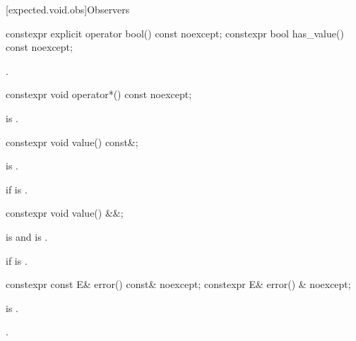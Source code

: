 [expected.void.obs]{Observers}

%
%
\begin{itemdecl}
constexpr explicit operator bool() const noexcept;
constexpr bool has_value() const noexcept;
\end{itemdecl}

\begin{itemdescr}
\pnum
\returns
{}.
\end{itemdescr}

%
\begin{itemdecl}
constexpr void operator*() const noexcept;
\end{itemdecl}

\begin{itemdescr}
\pnum
\hardexpects
{} is .
\end{itemdescr}

%
\begin{itemdecl}
constexpr void value() const&;
\end{itemdecl}

\begin{itemdescr}
\pnum
\mandates
{} is .

\pnum
\throws
{} if  is .
\end{itemdescr}

%
\begin{itemdecl}
constexpr void value() &&;
\end{itemdecl}

\begin{itemdescr}
\pnum
\mandates
{} is  and  is .

\pnum
\throws
{} if  is .
\end{itemdescr}

%
\begin{itemdecl}
constexpr const E& error() const& noexcept;
constexpr E& error() & noexcept;
\end{itemdecl}

\begin{itemdescr}
\pnum
\hardexpects
{} is .

\pnum
\returns
{}.
\end{itemdescr}


